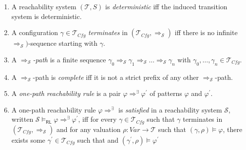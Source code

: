 \documentclass{article}
\newcommand{\RL}{\mathsf{RL}}
\newcommand{\Var}{\mathit{Var}}
\newcommand{\Tcfg}{\mathcal{T}_{\mathit{Cfg}}}
\begin{document}
\begin{definition}
\begin{enumerate}
    \item A reachability system $(\mathcal{T}, S)$ is \emph{deterministic} iff the induced transition system
          is deterministic.

    \item A configuration $\gamma \in \Tcfg$ \emph{terminates} in $(\Tcfg , \Rightarrow_{\mathcal{S}})$
          iff there is no infinite $\Rightarrow_{\mathcal{S}})$-sequence starting with $\gamma$.
          
    \item A \emph{$\Rightarrow_{\mathcal{S}}$-path} is a finite
          sequence $\gamma_0 \Rightarrow_{\mathcal{S}} \gamma_1 \Rightarrow_{\mathcal{S}} \ldots
          \Rightarrow_{\mathcal{S}} \gamma_n$
          with $\gamma_0,\ldots,\gamma_n \in \Tcfg$.
          
    \item A $\Rightarrow_{\mathcal{S}}$-path is \emph{complete}
          iff it is not a strict prefix of any
          other $\Rightarrow_{\mathcal{S}}$-path.

    \item A \emph{one-path reachability rule}
          is a pair $\varphi \Rightarrow^\exists \varphi^\prime$ of patterns $\varphi$ and $\varphi^\prime$.

    \item A one-path reachability rule $\varphi \Rightarrow^\exists$ is \emph{satisfied}
          in a reachability system $\mathcal{S}$,
          written $\mathcal{S} \vDash_\RL \varphi \Rightarrow^\exists \varphi^\prime$,
          iff for every $\gamma \in \Tcfg$
          such that $\gamma$ terminates in $(\Tcfg, \Rightarrow_{\mathcal{S}})$
          and for any valuation $\rho : \Var \to \mathcal{T}$
          such that $(\gamma, \rho) \vDash \varphi$,
          there exists some $\gamma^\prime \in \Tcfg$
          such that
          and $(\gamma^\prime, \rho) \vDash \varphi^\prime$

\end{enumerate}


\end{definition}
\end{document}

